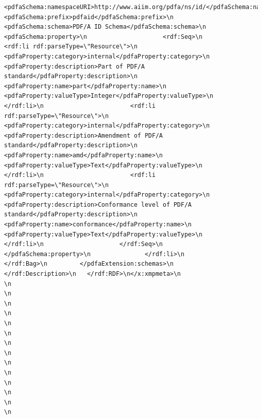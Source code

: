 \documentclass[
  letterpaper,
  DIV=11,
  numbers=noendperiod]{scrreprt}
\begin{document}
\begin{verbatim}
<pdfaSchema:namespaceURI>http://www.aiim.org/pdfa/ns/id/</pdfaSchema:namespaceURI>\n                  <pdfaSchema:prefix>pdfaid</pdfaSchema:prefix>\n                  <pdfaSchema:schema>PDF/A ID Schema</pdfaSchema:schema>\n                  <pdfaSchema:property>\n                     <rdf:Seq>\n                        <rdf:li rdf:parseType=\"Resource\">\n                           <pdfaProperty:category>internal</pdfaProperty:category>\n                           <pdfaProperty:description>Part of PDF/A standard</pdfaProperty:description>\n                           <pdfaProperty:name>part</pdfaProperty:name>\n                           <pdfaProperty:valueType>Integer</pdfaProperty:valueType>\n                        </rdf:li>\n                        <rdf:li rdf:parseType=\"Resource\">\n                           <pdfaProperty:category>internal</pdfaProperty:category>\n                           <pdfaProperty:description>Amendment of PDF/A standard</pdfaProperty:description>\n                           <pdfaProperty:name>amd</pdfaProperty:name>\n                           <pdfaProperty:valueType>Text</pdfaProperty:valueType>\n                        </rdf:li>\n                        <rdf:li rdf:parseType=\"Resource\">\n                           <pdfaProperty:category>internal</pdfaProperty:category>\n                           <pdfaProperty:description>Conformance level of PDF/A standard</pdfaProperty:description>\n                           <pdfaProperty:name>conformance</pdfaProperty:name>\n                           <pdfaProperty:valueType>Text</pdfaProperty:valueType>\n                        </rdf:li>\n                     </rdf:Seq>\n                  </pdfaSchema:property>\n               </rdf:li>\n            </rdf:Bag>\n         </pdfaExtension:schemas>\n      </rdf:Description>\n   </rdf:RDF>\n</x:xmpmeta>\n                                                                                                    \n                                                                                                    \n                                                                                                    \n                                                                                                    \n                                                                                                    \n                                                                                                    \n                                                                                                    \n                                                                                                    \n                                                                                                    \n                                                                                                    \n                                                                                                    \n                                                                                                    \n                                                                                                    \n                                                                                                    \n                                       
\end{verbatim}
\end{document}
